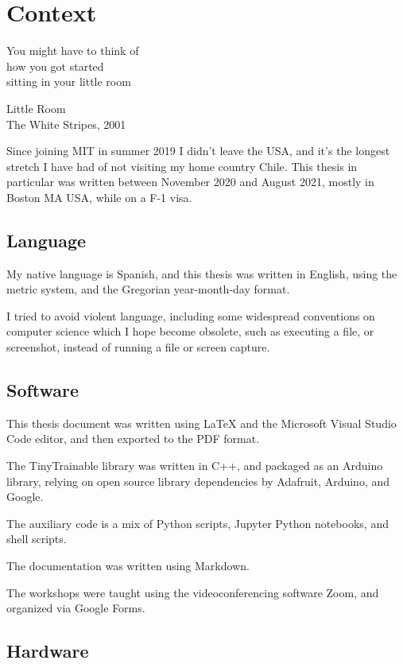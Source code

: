\chapter{Context}

\epigraph{You might have to think  of \\ how you got started \\ sitting in your little room}{Little Room \\ The White Stripes, 2001}

Since joining MIT in summer 2019 I didn't leave the USA, and it's the longest stretch I have had of not visiting my home country Chile. This thesis in particular was written between November 2020 and August 2021, mostly in Boston MA USA, while on a F-1 visa.

\section{Language}

My native language is Spanish, and this thesis was written in English, using the metric system, and the Gregorian year-month-day format.

I tried to avoid violent language, including some widespread conventions on computer science which I hope become obsolete, such as executing a file, or screenshot, instead of running a file or screen capture.

\section{Software}

This thesis document was written using LaTeX and the Microsoft Visual Studio Code editor, and then exported to the PDF format.

The TinyTrainable library was written in C++, and packaged as an Arduino library, relying on open source library dependencies by Adafruit, Arduino, and Google.

The auxiliary code is a mix of Python scripts, Jupyter Python notebooks, and shell scripts.

The documentation was written using Markdown.

The workshops were taught using the videoconferencing software Zoom, and organized via Google Forms.

\section{Hardware}

